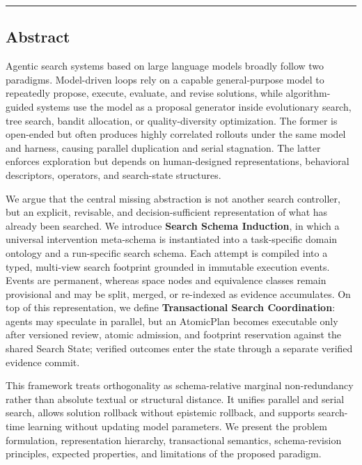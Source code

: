 \documentclass[
  11pt]{ctexart}
\begin{document}
\begin{center}\rule{0.5\linewidth}{0.5pt}\end{center}

\subsection{Abstract}\label{abstract}

Agentic search systems based on large language models broadly follow two
paradigms. Model-driven loops rely on a capable general-purpose model to
repeatedly propose, execute, evaluate, and revise solutions, while
algorithm-guided systems use the model as a proposal generator inside
evolutionary search, tree search, bandit allocation, or
quality-diversity optimization. The former is open-ended but often
produces highly correlated rollouts under the same model and harness,
causing parallel duplication and serial stagnation. The latter enforces
exploration but depends on human-designed representations, behavioral
descriptors, operators, and search-state structures.

We argue that the central missing abstraction is not another search
controller, but an explicit, revisable, and decision-sufficient
representation of what has already been searched. We introduce
\textbf{Search Schema Induction}, in which a universal intervention
meta-schema is instantiated into a task-specific domain ontology and a
run-specific search schema. Each attempt is compiled into a typed,
multi-view search footprint grounded in immutable execution events.
Events are permanent, whereas space nodes and equivalence classes remain
provisional and may be split, merged, or re-indexed as evidence
accumulates. On top of this representation, we define
\textbf{Transactional Search Coordination}: agents may speculate in
parallel, but an AtomicPlan becomes executable only after versioned
review, atomic admission, and footprint reservation against the shared
Search State; verified outcomes enter the state through a separate
verified evidence commit.

This framework treats orthogonality as schema-relative marginal
non-redundancy rather than absolute textual or structural distance. It
unifies parallel and serial search, allows solution rollback without
epistemic rollback, and supports search-time learning without updating
model parameters. We present the problem formulation, representation
hierarchy, transactional semantics, schema-revision principles, expected
properties, and limitations of the proposed paradigm.
\end{document}
